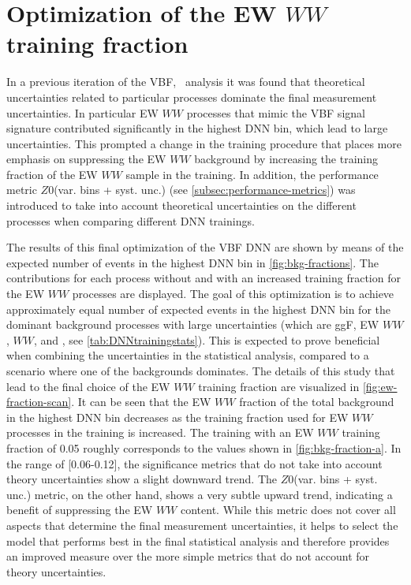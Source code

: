 \section{Optimization of the EW $WW$ training fraction}
\label{app:sec:ewww-sample-fraction-optimization}
In a previous iteration of the VBF, \HWW\ analysis it was found that theoretical uncertainties related to particular processes dominate the final measurement uncertainties. In particular EW $WW$ processes that mimic the VBF signal signature contributed significantly in the highest DNN bin, which lead to large uncertainties.
This prompted a change in the training procedure that places more emphasis on suppressing the EW $WW$ background by increasing the training fraction of the EW $WW$ sample in the training.
In addition, the performance metric $Z0$(var. bins + syst. unc.) (see \cref{subsec:performance-metrics}) was introduced to take into account theoretical uncertainties on the different processes when comparing different DNN trainings.

The results of this final optimization of the VBF DNN are shown by means of the expected number of events in the highest DNN bin in \cref{fig:bkg-fractions}. The contributions for each process without and with an increased training fraction for the EW $WW$ processes are displayed.
The goal of this optimization is to achieve approximately equal number of expected events in the highest DNN bin for the dominant background processes with large uncertainties (which are ggF, EW $WW$, $WW$, and \ttbar, see \cref{tab:DNNtrainingstats}).
This is expected to prove beneficial when combining the uncertainties in the statistical analysis, compared to a scenario where one of the backgrounds dominates.
The details of this study that lead to the final choice of the EW $WW$ training fraction are visualized in \cref{fig:ew-fraction-scan}.
It can be seen that the EW $WW$ fraction of the total background in the highest DNN bin decreases as the training fraction used for EW $WW$ processes in the training is increased.
The training with an EW $WW$ training fraction of 0.05 roughly corresponds to the values shown in \cref{fig:bkg-fraction-a}.
In the range of [0.06-0.12], the significance metrics that do not take into account theory uncertainties show a slight downward trend. The $Z0$(var. bins + syst. unc.) metric, on the other hand, shows a very subtle upward trend, indicating a benefit of suppressing the EW $WW$ content. While this metric does not cover all aspects that determine the final measurement uncertainties, it helps to select the model that performs best in the final statistical analysis and therefore provides an improved measure over the more simple metrics that do not account for theory uncertainties.

